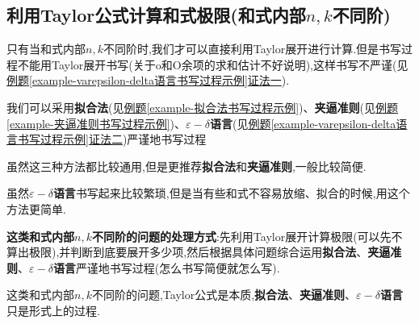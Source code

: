 \documentclass[../../main.tex]{subfiles}%
\begin{document}
\subsection{利用Taylor公式计算和式极限(和式内部$n,k$不同阶)}

只有当和式内部$n,k$不同阶时,我们才可以直接利用Taylor展开进行计算.但是书写过程不能用Taylor展开书写(关于o和O余项的求和估计不好说明),这样书写不严谨(见\hyperref[example-varepsilon-delta语言书写过程示例]{例题\ref{example-varepsilon-delta语言书写过程示例}证法一}).

我们可以采用\textbf{拟合法}(见\hyperref[example-拟合法书写过程示例]{例题\ref{example-拟合法书写过程示例}})、\textbf{夹逼准则}(见\hyperref[example-夹逼准则书写过程示例]{例题\ref{example-夹逼准则书写过程示例}})、\textbf{$\varepsilon-\delta$语言}(见\hyperref[example-varepsilon-delta语言书写过程示例]{例题\ref{example-varepsilon-delta语言书写过程示例}证法二})严谨地书写过程

\begin{remark}
虽然这三种方法都比较通用,但是更推荐\textbf{拟合法}和\textbf{夹逼准则},一般比较简便.

虽然\textbf{$\varepsilon-\delta$语言}书写起来比较繁琐,但是当有些和式不容易放缩、拟合的时候,用这个方法更简单.
\end{remark}

\textbf{这类和式内部$n,k$不同阶的问题的处理方式}:先利用Taylor展开计算极限(可以先不算出极限),并判断到底要展开多少项,然后根据具体问题综合运用\textbf{拟合法}、\textbf{夹逼准则}、\textbf{$\varepsilon-\delta$语言}严谨地书写过程(怎么书写简便就怎么写).

\begin{remark}
这类和式内部$n,k$不同阶的问题,Taylor公式是本质,\textbf{拟合法}、\textbf{夹逼准则}、\textbf{$\varepsilon-\delta$语言}只是形式上的过程.
\end{remark}
\end{document}
